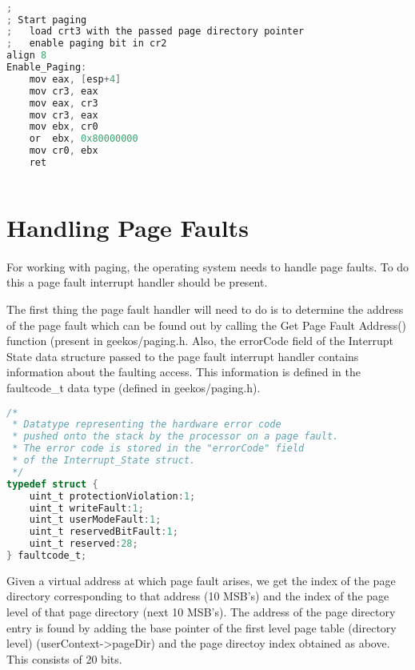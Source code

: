 \documentclass[11pt]{article}
\begin{document}
\begin{lstlisting}[language=c]

;
; Start paging
;	load crt3 with the passed page directory pointer
;	enable paging bit in cr2
align 8
Enable_Paging:
	mov	eax, [esp+4]
	mov	cr3, eax
	mov	eax, cr3
	mov	cr3, eax
	mov	ebx, cr0
	or	ebx, 0x80000000
	mov	cr0, ebx
	ret
    
\end{lstlisting}

\section{Handling Page Faults}
\paragraph{}


For working with paging, the operating system needs to handle page faults. To do this a page fault interrupt handler should be present.

The first thing the page fault handler will need to do is to determine the address of the page fault which can be found out  by calling the Get Page Fault Address() function (present in  geekos/paging.h. Also, the errorCode field of the Interrupt
State data structure passed to the page fault interrupt handler contains information about the faulting
access. This information is defined in the faultcode\_t data type (defined in geekos/paging.h).

\begin{lstlisting}[language=c]
/*
 * Datatype representing the hardware error code
 * pushed onto the stack by the processor on a page fault.
 * The error code is stored in the "errorCode" field
 * of the Interrupt_State struct.
 */
typedef struct {
    uint_t protectionViolation:1;
    uint_t writeFault:1;
    uint_t userModeFault:1;
    uint_t reservedBitFault:1;
    uint_t reserved:28;
} faultcode_t;

\end{lstlisting}



Given a virtual address at which page fault arises, we get the index of the page directory corresponding to that address (10 MSB's) and the index of the page level of  that page directory (next 10 MSB's). The address of the page directory entry is found by adding the base pointer of the first level page table (directory level) (userContext->pageDir) and the page directoy index obtained as above. This consists of 20 bits.
\end{document}
